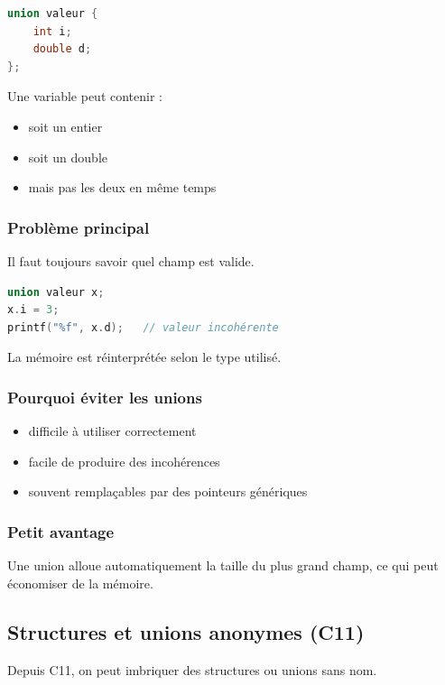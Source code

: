 \begin{lstlisting}[language=C]
union valeur {
    int i;
    double d;
};
\end{lstlisting}

Une variable peut contenir :

\begin{itemize}
    \item soit un entier
    \item soit un double
    \item mais pas les deux en même temps
\end{itemize}

\subsubsection{Problème principal}

Il faut toujours savoir quel champ est valide.

\begin{lstlisting}[language=C]
union valeur x;
x.i = 3;
printf("%f", x.d);   // valeur incohérente
\end{lstlisting}

La mémoire est réinterprétée selon le type utilisé.

\subsubsection{Pourquoi éviter les unions}

\begin{itemize}
    \item difficile à utiliser correctement
    \item facile de produire des incohérences
    \item souvent remplaçables par des pointeurs génériques
\end{itemize}

\subsubsection{Petit avantage}

Une union alloue automatiquement la taille du plus grand champ,
ce qui peut économiser de la mémoire.

\subsection{Structures et unions anonymes (C11)}

Depuis C11, on peut imbriquer des structures ou unions sans nom.

